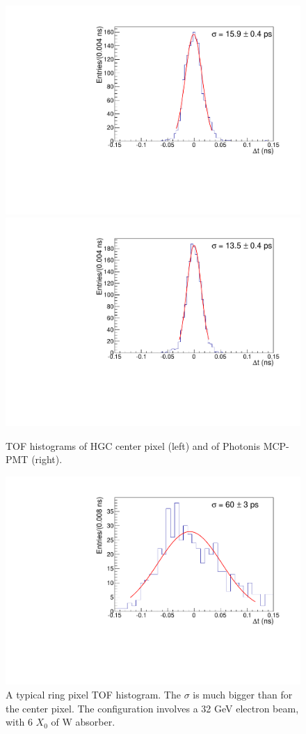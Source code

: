 \documentclass[twocolumn,aps,prd,reprint,superscriptaddress,floatfix]{revtex4-1}
\begin{document}
\begin{figure}[!htbp]
\centering
	\includegraphics[width=.49\textwidth]{deltaTCenter104.pdf}
	\includegraphics[width=.49\textwidth]{deltaTMCP104.pdf}
	\caption{TOF histograms of HGC center pixel (left) and of Photonis MCP-PMT (right).}
	\label{fig:center_MCP_104}
\end{figure}

\begin{figure}[!htbp]
\centering
	\includegraphics[width=\linewidth]{deltaTPicoSilPixel4.pdf}
    \caption{A typical ring pixel TOF histogram. The $\sigma$ is much bigger than for the center pixel. The configuration involves a 32 GeV electron beam, with 6 $X_0$ of W absorber.}
    \label{fig:ringpixel}
\end{figure}
\end{document}
